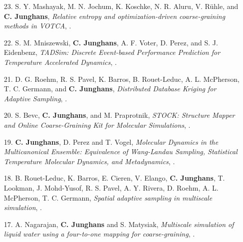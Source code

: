 \documentclass{article}
\begin{document}
\begin{enumerate}
\item[23.] S. Y. Mashayak, M. N. Jochum, K. Koschke, N. R. Aluru, V. R{\"u}hle, and \textbf{C. Junghans},
  \textit{Relative entropy and optimization-driven coarse-graining methods in VOTCA},
  .

\item[22.] S. M. Mniszewski, \textbf{C. Junghans}, A. F. Voter, D. Perez, and S. J. Eidenbenz,
  \textit{TADSim: Discrete Event-based Performance Prediction for Temperature Accelerated Dynamics},
  .

\item[21.] D. G. Roehm, R. S. Pavel, K. Barros, B. Rouet-Leduc, A. L. McPherson, T. C. Germann, and \textbf{C. Junghans},
  \textit{Distributed Database Kriging for Adaptive Sampling},
  .

\item[20.] S. Bevc, \textbf{C. Junghans}, and M. Praprotnik,
  \textit{STOCK: Structure Mapper and Online Coarse-Graining Kit for Molecular Simulations},
  .

\item[19.] \textbf{C. Junghans}, D. Perez and T. Vogel,
  \textit{Molecular Dynamics in the Multicanonical Ensemble: Equivalence of Wang-Landau Sampling, Statistical Temperature Molecular Dynamics, and Metadynamics},
  .

\item[18.] B. Rouet-Leduc, K. Barros, E. Cieren, V. Elango, \textbf{C. Junghans}, T. Lookman, J. Mohd-Yusof, R. S. Pavel, A. Y. Rivera, D. Roehm, A. L. McPherson, T. C. Germann,
  \textit{Spatial adaptive sampling in multiscale simulation},
  .

\item[17.] A. Nagarajan, \textbf{C. Junghans} and S. Matysiak,
  \textit{Multiscale simulation of liquid water using a four-to-one mapping for coarse-graining},
  .


\end{enumerate}
\end{document}
